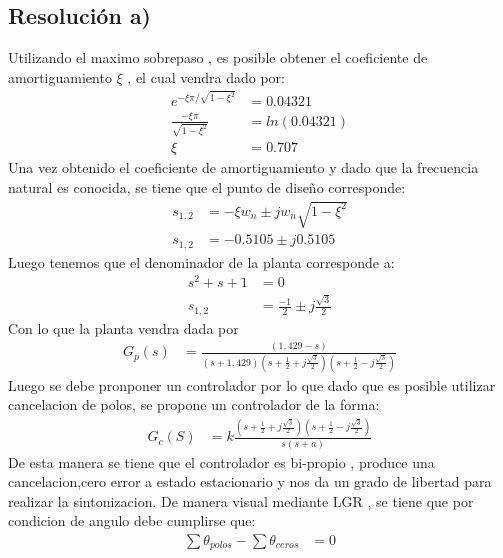 \documentclass[
  11pt,
  letterpaper,
   addpoints,
   answers
  ]{exam}
\begin{document}
\begin{questions}
\begin{solution}
    \subsection*{Resolución a)}
    Utilizando el maximo sobrepaso , es posible obtener el coeficiente de amortiguamiento $\xi$ , el cual vendra dado por:
    \begin{align}
        e^{-\xi \pi / \sqrt{1-\xi^{2}}} &= 0.04321\\
        \frac{-\xi \pi }{\sqrt{1-\xi^{2}}} &= ln(0.04321)\\
        \xi &= 0.707
    \end{align}
    Una vez obtenido el coeficiente de amortiguamiento y dado que la frecuencia natural es conocida, se tiene que el punto de diseño corresponde:
    \begin{align}
        s_{1,2} &= -\xi w_n \pm jw_n \sqrt{1-\xi^{2}}\\
        s_{1,2} &= -0.5105 \pm j0.5105
    \end{align}
    Luego tenemos que el denominador de la planta corresponde a:
    \begin{align}
        s^{2}+s+1 &= 0\\
        s_{1,2} &= \frac{-1}{2} \pm j\frac{\sqrt{3}}{2}
    \end{align}
    Con lo que la planta vendra dada por 
  \begin{align}
    G_p(s) &= \frac{(1,429 - s)}{(s + 1,429)\left(s + \frac{1}{2} + j \frac{\sqrt{3}}{2}\right)\left(s + \frac{1}{2} - j \frac{\sqrt{3}}{2}\right)}
\end{align}
Luego se debe pronponer un controlador por lo que dado que es posible utilizar cancelacion de polos, se propone un controlador de la forma:
\begin{align}
    G_c(S) &= k \frac{\left(s + \frac{1}{2} + j \frac{\sqrt{3}}{2}\right)\left(s + \frac{1}{2} - j \frac{\sqrt{3}}{2}\right)}{s(s+a)}
\end{align}
De esta manera se tiene que el controlador es bi-propio , produce una cancelacion,cero error a estado estacionario y nos da un grado de libertad para realizar la sintonizacion. De manera visual mediante LGR , se tiene que por condicion de angulo debe cumplirse que:
\begin{align}
    \sum \theta_{polos} - \sum \theta_{ceros} &= 0
\end{align}

\end{solution}
\end{questions}
\end{document}

